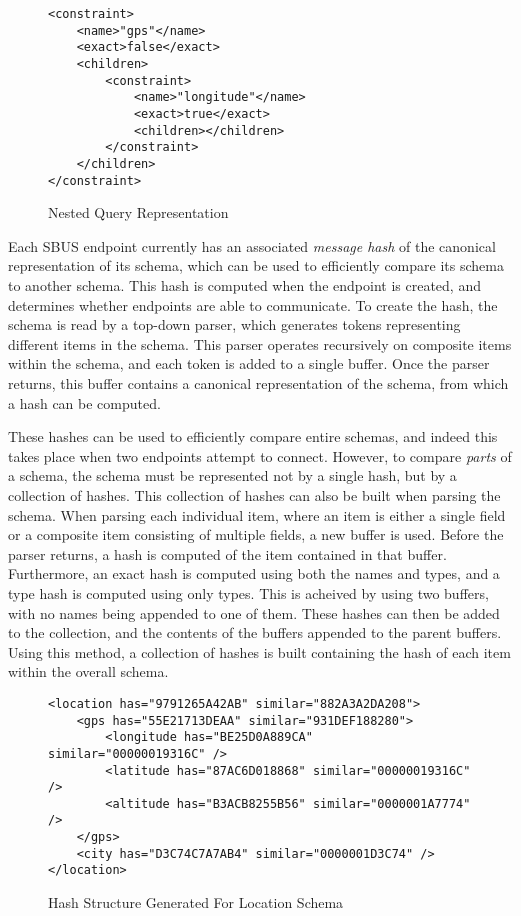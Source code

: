 \documentclass[12pt,twoside,notitlepage]{report}
\begin{document}
\begin{figure}
\begin{lstlisting}[style=xml]
<constraint>
	<name>"gps"</name>
	<exact>false</exact>
	<children>
		<constraint>
			<name>"longitude"</name>
			<exact>true</exact>
			<children></children>
		</constraint>
	</children>
</constraint>
\end{lstlisting}
\caption{Nested Query Representation}
\label{fig:nested_query}
\end{figure} 

Each SBUS endpoint currently has an associated {\sl message hash} of the canonical representation of its schema, which can be used to efficiently compare its schema to another schema. 
This hash is computed when the endpoint is created, and determines whether endpoints are able to communicate. 
To create the hash, the schema is read by a top-down parser, which generates tokens representing different items in the schema. 
This parser operates recursively on composite items within the schema, and each token is added to a single buffer. 
Once the parser returns, this buffer contains a canonical representation of the schema, from which a hash can be computed. 

These hashes can be used to efficiently compare entire schemas, and indeed this takes place when two endpoints attempt to connect. 
However, to compare {\sl parts} of a schema, the schema must be represented not by a single hash, but by a collection of hashes. 
This collection of hashes can also be built when parsing the schema. 
When parsing each individual item, where an item is either a single field or a composite item consisting of multiple fields, a new buffer is used. 
Before the parser returns, a hash is computed of the item contained in that buffer. 
Furthermore, an exact hash is computed using both the names and types, and a type hash is computed using only types. 
This is acheived by using two buffers, with no names being appended to one of them. 
These hashes can then be added to the collection, and the contents of the buffers appended to the parent buffers. 
Using this method, a collection of hashes is built containing the hash of each item within the overall schema. 

\begin{figure}
\begin{lstlisting}[style=xml]
<location has="9791265A42AB" similar="882A3A2DA208">
	<gps has="55E21713DEAA" similar="931DEF188280">
		<longitude has="BE25D0A889CA" similar="00000019316C" />
		<latitude has="87AC6D018868" similar="00000019316C" />
		<altitude has="B3ACB8255B56" similar="0000001A7774" />
	</gps>
	<city has="D3C74C7A7AB4" similar="0000001D3C74" />
</location>
\end{lstlisting}
\caption{Hash Structure Generated For Location Schema}
\label{fig:locationhashes}
\end{figure}
\end{document}
